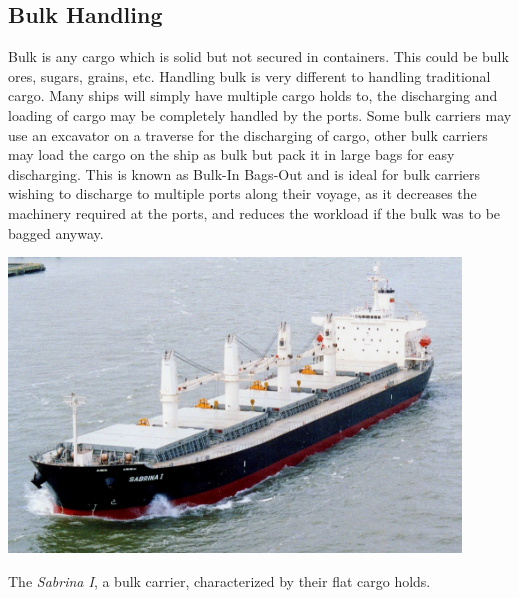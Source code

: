 \documentclass[11pt,a4paper]{article}
\begin{document}
\subsection{Bulk Handling}
Bulk is any cargo which is solid but not secured in containers. This could be bulk ores, sugars, grains, etc. Handling bulk is very different to handling traditional cargo. Many ships will simply have multiple cargo holds to, the discharging and loading of cargo may be completely handled by the ports. Some bulk carriers may use an excavator on a traverse for the discharging of cargo, other bulk carriers may load the cargo on the ship as bulk but pack it in large bags for easy discharging. This is known as Bulk-In Bags-Out and is ideal for bulk carriers wishing to discharge to multiple ports along their voyage, as it decreases the machinery required at the ports, and reduces the workload if the bulk was to be bagged anyway.
\begin{center}
\includegraphics[width=12cm]{bulk}\par
The \textit{Sabrina I}, a bulk carrier, characterized by their flat cargo holds.
\end{center}
\end{document}
